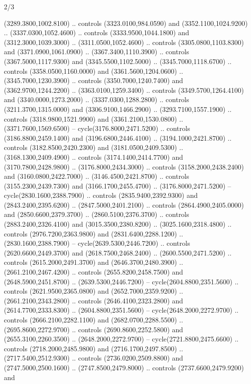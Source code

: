 \begin{flagdescription}{2/3}
\begin{scope}[shift={(0.5\flaglength,0.5)},scale=\flagwidth/130]
\begin{scope}[y=0.01mm, x=0.01mm,shift={(-3365,-2250)}]
  (3289.3800,1002.8100) .. controls (3323.0100,984.0590) and
  (3352.1100,1024.9200) .. (3337.0300,1052.4600) .. controls
  (3333.9500,1044.1800) and (3312.3000,1039.3000) .. (3311.0500,1052.4600) ..
  controls (3305.0800,1103.8300) and (3371.0900,1061.0900) ..
  (3367.3400,1110.3900) .. controls (3367.5000,1117.9300) and
  (3345.5500,1102.5000) .. (3345.7000,1118.6700) .. controls
  (3358.0500,1160.0000) and (3361.5600,1204.0600) .. (3345.7000,1230.3900) ..
  controls (3350.7000,1240.7400) and (3362.9700,1244.2200) ..
  (3363.0100,1259.3400) .. controls (3349.5700,1264.4100) and
  (3340.0000,1273.2000) .. (3337.0300,1288.2800) .. controls
  (3211.3700,1315.0000) and (3306.9100,1466.2900) .. (3293.7100,1557.1900) ..
  controls (3318.9800,1521.9900) and (3361.2100,1530.0800) ..
  (3371.7600,1569.6500) -- cycle(3176.8000,2471.5200) .. controls
  (3186.8800,2459.1400) and (3196.6800,2446.4100) .. (3194.1000,2421.8700) ..
  controls (3182.8500,2420.2300) and (3181.0500,2409.5300) ..
  (3168.1300,2409.4900) .. controls (3174.1400,2414.7700) and
  (3170.7800,2428.9800) .. (3176.8000,2434.3000) .. controls
  (3158.2000,2438.2400) and (3160.0800,2422.7000) .. (3146.4500,2421.8700) ..
  controls (3155.2300,2439.7300) and (3166.1700,2455.4700) ..
  (3176.8000,2471.5200) -- cycle(2830.1600,2388.7900) .. controls
  (2835.9400,2392.9300) and (2843.2400,2395.6200) .. (2847.5000,2401.2100) ..
  controls (2864.4900,2405.0000) and (2850.6600,2379.3700) ..
  (2860.5100,2376.3700) .. controls (2883.2400,2326.4100) and
  (3015.3500,2380.8200) .. (3025.1600,2318.4800) .. controls
  (2976.7200,2363.9800) and (2831.6400,2288.1200) .. (2830.1600,2388.7900) --
  cycle(2639.5300,2446.7200) .. controls (2620.6600,2449.3700) and
  (2618.7500,2468.2400) .. (2600.5500,2471.5200) .. controls
  (2615.2000,2491.3700) and (2646.3700,2480.3900) .. (2661.2100,2467.4200) ..
  controls (2655.8200,2458.7500) and (2648.5900,2451.8700) ..
  (2639.5300,2446.7200) -- cycle(2604.8800,2351.5600) .. controls
  (2621.9500,2365.0800) and (2652.7000,2359.9200) .. (2661.2100,2343.2800) ..
  controls (2646.4100,2323.2800) and (2614.7700,2333.8300) ..
  (2604.8800,2351.5600) -- cycle(2648.2000,2272.9700) .. controls
  (2666.2100,2282.1100) and (2682.0700,2288.5500) .. (2695.8600,2272.9700) ..
  controls (2690.8600,2252.5800) and (2655.3100,2260.3500) ..
  (2648.2000,2272.9700) -- cycle(2721.8800,2475.6600) .. controls
  (2718.2000,2485.9800) and (2716.1700,2497.8500) .. (2717.5400,2512.9300) ..
  controls (2736.0200,2509.8800) and (2747.5000,2500.1600) ..
  (2747.8500,2479.8000) .. controls (2737.6600,2479.9200) and

\end{scope}
\end{scope}
\end{flagdescription}
